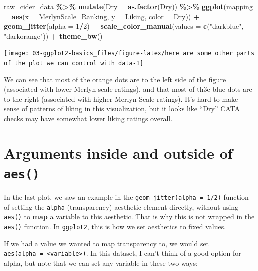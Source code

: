 \documentclass[
]{book}
\newenvironment{Shaded}{\begin{snugshade}}{\end{snugshade}}
\newcommand{\AttributeTok}[1]{\textcolor[rgb]{0.13,0.29,0.53}{#1}}
\newcommand{\DecValTok}[1]{\textcolor[rgb]{0.00,0.00,0.81}{#1}}
\newcommand{\FunctionTok}[1]{\textcolor[rgb]{0.13,0.29,0.53}{\textbf{#1}}}
\newcommand{\NormalTok}[1]{#1}
\newcommand{\SpecialCharTok}[1]{\textcolor[rgb]{0.81,0.36,0.00}{\textbf{#1}}}
\newcommand{\StringTok}[1]{\textcolor[rgb]{0.31,0.60,0.02}{#1}}
\begin{document}
\begin{Shaded}
\begin{Highlighting}[]
\NormalTok{raw\_cider\_data }\SpecialCharTok{\%\textgreater{}\%}
  \FunctionTok{mutate}\NormalTok{(}\AttributeTok{Dry =} \FunctionTok{as.factor}\NormalTok{(Dry)) }\SpecialCharTok{\%\textgreater{}\%}
  \FunctionTok{ggplot}\NormalTok{(}\AttributeTok{mapping =} \FunctionTok{aes}\NormalTok{(}\AttributeTok{x =}\NormalTok{ MerlynScale\_Ranking, }\AttributeTok{y =}\NormalTok{ Liking, }\AttributeTok{color =}\NormalTok{ Dry)) }\SpecialCharTok{+}
  \FunctionTok{geom\_jitter}\NormalTok{(}\AttributeTok{alpha =} \DecValTok{1}\SpecialCharTok{/}\DecValTok{2}\NormalTok{) }\SpecialCharTok{+} 
  \FunctionTok{scale\_color\_manual}\NormalTok{(}\AttributeTok{values =} \FunctionTok{c}\NormalTok{(}\StringTok{"darkblue"}\NormalTok{, }\StringTok{"darkorange"}\NormalTok{)) }\SpecialCharTok{+} 
  \FunctionTok{theme\_bw}\NormalTok{()}
\end{Highlighting}
\end{Shaded}

\begin{center}\texttt{[image: 03-ggplot2-basics\_files/figure-latex/here are some other parts of the plot we can control with data-1]} \end{center}

We can see that most of the orange dots are to the left side of the figure (associated with lower Merlyn scale ratings), and that most of th3e blue dots are to the right (associated with higher Merlyn Scale ratings). It's hard to make sense of patterns of liking in this visualization, but it looks like ``Dry'' CATA checks may have somewhat lower liking ratings overall.

\hypertarget{arguments-inside-and-outside-of-aes}{%
\section{\texorpdfstring{Arguments inside and outside of \texttt{aes()}}{Arguments inside and outside of aes()}}\label{arguments-inside-and-outside-of-aes}}

In the last plot, we saw an example in the \texttt{geom\_jitter(alpha\ =\ 1/2)} function of setting the \texttt{alpha} (transparency) aesthetic element directly, without using \texttt{aes()} to \textbf{map} a variable to this aesthetic. That is why this is not wrapped in the \texttt{aes()} function. In \texttt{ggplot2}, this is how we set aesthetics to fixed values.

If we had a value we wanted to map transparency to, we would set \texttt{aes(alpha\ =\ \textless{}variable\textgreater{})}. In this dataset, I can't think of a good option for alpha, but note that we can set any variable in these two ways:
\end{document}
